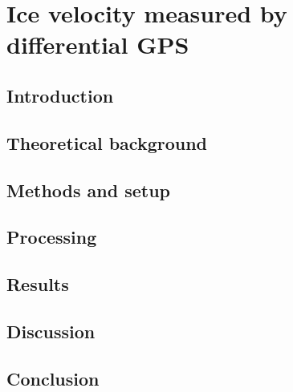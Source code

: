 

\renewcommand{\chapterauthor}{Moritz Bitterling, Linda Thielke, Julien Weihs}
\chapter{Ice velocity measured by differential GPS}
\label{gpsmeas}

\begin{abstract}

\end{abstract}


\section{Introduction}
%

\section{Theoretical background} \label{GPS:sec:Theoretical backround}


\section{Methods and setup} \label{GPS:sec:Methods and setup}


\section{Processing} \label{GPS:sec:Processing}


\section{Results} \label{GPS:sec:Results}


\section{Discussion} \label{GPS:sec:Discussion}


\section{Conclusion}




